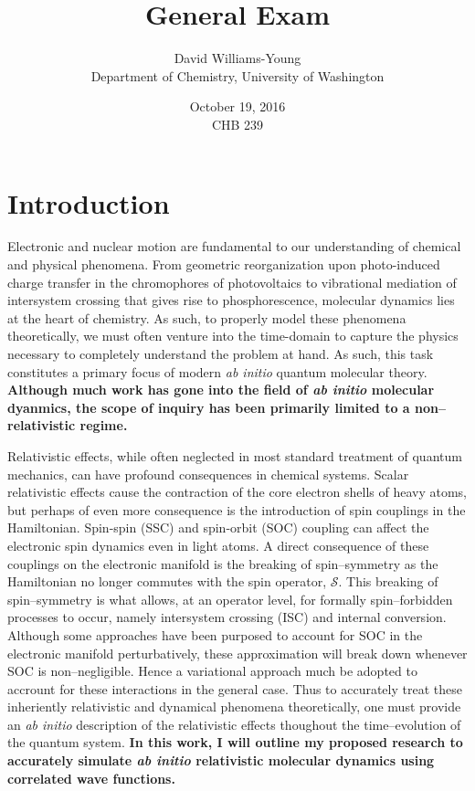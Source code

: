 \documentclass[12pt]{article}
\title{General Exam}
\date{October 19, 2016 \\ CHB 239}
\author{David Williams-Young\\ Department of Chemistry, University of Washington}
\newcommand*\op[1]{\mathcal{#1}}
\begin{document}
\maketitle


\newpage
\section{Introduction}

Electronic and nuclear motion are fundamental to our understanding of chemical
and physical phenomena. From  geometric reorganization upon photo-induced charge
transfer in the chromophores of photovoltaics  to vibrational mediation of
intersystem crossing that gives rise to phosphorescence,  molecular dynamics
lies at the heart of chemistry.  As such, to properly model these phenomena
theoretically, we must often venture into the time-domain to capture the physics
necessary to completely understand the problem at hand. As such, this task
constitutes a primary focus of modern \emph{ab initio} quantum molecular theory.
{\bf
Although much work has gone into the field of \emph{ab initio} molecular
dyanmics, the scope of inquiry has been primarily limited to a non--relativistic
regime.
}

Relativistic effects, while often neglected in most standard treatment of
quantum mechanics, can have profound consequences in chemical
systems.\cite{Pyykko12_45} Scalar relativistic effects cause the contraction of
the core electron shells of heavy atoms, but perhaps of even more consequence is
the introduction of spin couplings in the Hamiltonian.  Spin-spin (SSC) and
spin-orbit (SOC) coupling can affect the electronic spin dynamics even in light
atoms. A direct consequence of these couplings on the electronic manifold is the
breaking of spin--symmetry as the Hamiltonian no longer commutes with the spin
operator, $\op{S}$. This breaking of spin--symmetry is what allows, at an
operator level, for formally spin--forbidden processes to occur, namely
intersystem crossing (ISC) and internal conversion. Although some approaches
have been purposed to account for SOC in the electronic manifold
perturbatively\cite{Thiel14_JCP124101}, these approximation will break down
whenever SOC is non--negligible. Hence a variational approach much be adopted to
accrount for these interactions in the general case.  Thus to accurately treat
these inheriently relativistic and dynamical phenomena theoretically, one must
provide an \emph{ab initio} description of the relativistic effects thoughout
the time--evolution of the quantum system.  
{\bf 
In this work, I will outline my proposed research to accurately simulate
\emph{ab initio} relativistic molecular dynamics using correlated wave
functions.
}  
\end{document}
